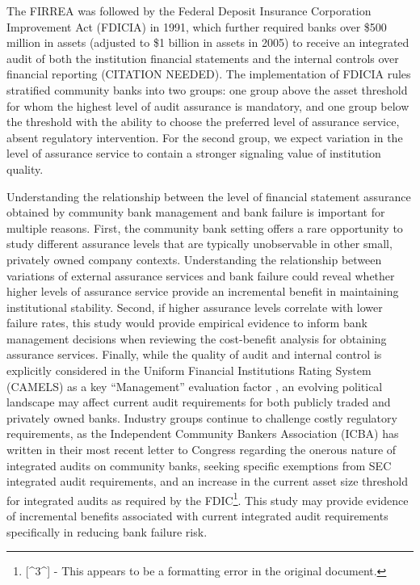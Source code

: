 \documentclass[12pt,letterpaper]{article}
\begin{document}
The FIRREA was followed by the Federal Deposit Insurance Corporation Improvement Act (FDICIA) in 1991, which further required banks over \$500 million in assets (adjusted to \$1 billion in assets in 2005) to receive an integrated audit of both the institution financial statements and the internal controls over financial reporting (CITATION NEEDED). The implementation of FDICIA rules stratified community banks into two groups: one group above the asset threshold for whom the highest level of audit assurance is mandatory, and one group below the threshold with the ability to choose the preferred level of assurance service, absent regulatory intervention. For the second group, we expect variation in the level of assurance service to contain a stronger signaling value of institution quality.

Understanding the relationship between the level of financial statement assurance obtained by community bank management and bank failure is important for multiple reasons. First, the community bank setting offers a rare opportunity to study different assurance levels that are typically unobservable in other small, privately owned company contexts. Understanding the relationship between variations of external assurance services and bank failure could reveal whether higher levels of assurance service provide an incremental benefit in maintaining institutional stability. Second, if higher assurance levels correlate with lower failure rates, this study would provide empirical evidence to inform bank management decisions when reviewing the cost-benefit analysis for obtaining assurance services. Finally, while the quality of audit and internal control is explicitly considered in the Uniform Financial Institutions Rating System (CAMELS) as a key ``Management'' evaluation factor \parencite{FDIC2023}, an evolving political landscape may affect current audit requirements for both publicly traded and privately owned banks. Industry groups continue to challenge costly regulatory requirements, as the Independent Community Bankers Association (ICBA) has written in their most recent letter to Congress regarding the onerous nature of integrated audits on community banks, seeking specific exemptions from SEC integrated audit requirements, and an increase in the current asset size threshold for integrated audits as required by the FDIC\footnote{[^3^] - This appears to be a formatting error in the original document.}. This study may provide evidence of incremental benefits associated with current integrated audit requirements specifically in reducing bank failure risk.
\end{document}
